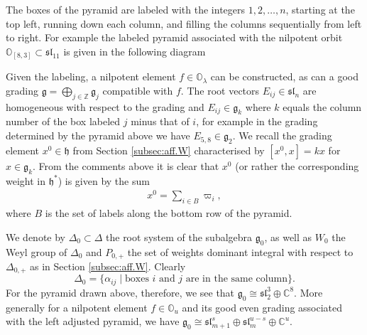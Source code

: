 \documentclass[12pt]{amsart}
\theoremstyle{plain}
\theoremstyle{definition}
\numberwithin{equation}{section}
\newcommand{\al}{\alpha}
\newcommand{\la}{\lambda}
\newcommand{\D}{\Delta}
\newcommand{\C}{\mathbb{C}}
\newcommand{\Z}{\mathbb{Z}}
\newcommand{\g}{\mathfrak{g}}
\newcommand{\h}{\mathfrak{h}}
\newcommand{\n}{\mathfrak{n}}
\newcommand{\sll}{\mathfrak{sl}}
\newcommand{\mbo}{\mathbb{O}}
\begin{document}
The boxes of the pyramid are labeled with the integers $1, 2, \ldots, n$, starting at the top left, running down each column, and filling the columns sequentially from left to right. For example the labeled pyramid associated with the nilpotent orbit $\mbo_{[8, 3]} \subset \sll_{11}$ is given in the following diagram
\begin{center}
\end{center}
Given the labeling, a nilpotent element $f \in \mbo_\la$ can be constructed, as can a good grading $\g = \bigoplus_{j \in \Z} \g_j$ compatible with $f$. The root vectors $E_{ij} \in \sll_n$ are homogeneous with respect to the grading and $E_{ij} \in \g_k$ where $k$ equals the column number of the box labeled $j$ minus that of $i$, for example in the grading determined by the pyramid above we have $E_{5, 8} \in \g_{2}$. We recall the grading element $x^0 \in \h$ from Section \ref{subsec:aff.W} characterised by $[x^0, x] = k x$ for $x \in \g_k$. From the comments above it is clear that $x^0$ (or rather the corresponding weight in $\h^*$) is given by the sum
\begin{align}\label{eq:x0.description}
x^0 = \sum_{i \in B} \varpi_i,
\end{align}
where $B$ is the set of labels along the bottom row of the pyramid.

We denote by $\D_0 \subset \D$ the root system of the subalgebra $\g_0$, as well as $W_0$ the Weyl group of $\D_0$ and $P_{0, +}$ the set of weights dominant integral with respect to $\D_{0, +}$ as in Section \ref{subsec:aff.W}. Clearly
\[
\D_0 = \{\al_{ij} \mid \text{boxes $i$ and $j$ are in the same column}\}.
\]
For the pyramid drawn above, therefore, we see that $\g_0 \cong \sll_2^3 \oplus \C^8$. More generally for a nilpotent element $f \in \mbo_u$ and its good even grading associated with the left adjusted pyramid, we have $\g_0 \cong \sll_{m+1}^s \oplus \sll_m^{u-s} \oplus \C^{u}$.
\end{document}
